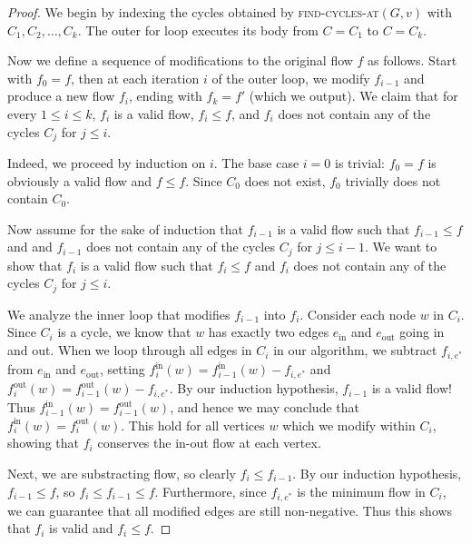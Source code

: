 \documentclass[10pt]{article}
\begin{document}
\begin{proof}
  We begin by indexing the cycles obtained by \textsc{find-cycles-at}\((G, v)\) with \(C_1, C_2, \ldots, C_k\). The outer for loop executes its body from \(C = C_1\) to \(C = C_k\). 

  Now we define a sequence of modifications to the original flow \(f\) as follows. Start with \(f_0 = f\), then at each iteration \(i\) of the outer loop, we modify \(f_{i - 1}\) and produce a new flow \(f_i\), ending with \(f_k = f'\) (which we output). We claim that for every \(1 \leq i \leq k\), \(f_i\) is a valid flow, \(f_i \leq f\), and \(f_i\) does not contain any of the cycles \(C_j\) for \(j \leq i\).

  Indeed, we proceed by induction on \(i\). The base case \(i = 0\) is trivial: \(f_0 = f\) is obviously a valid flow and \(f \leq f\). Since \(C_0\) does not exist, \(f_0\) trivially does not contain \(C_0\).

  Now assume for the sake of induction that \(f_{i - 1}\) is a valid flow such that \(f_{i - 1} \leq f\) and and \(f_{i - 1}\) does not contain any of the cycles \(C_j\) for \(j \leq i - 1\). We want to show that \(f_i\) is a valid flow such that \(f_i \leq f\) and \(f_i\) does not contain any of the cycles \(C_j\) for \(j \leq i\).

  We analyze the inner loop that modifies \(f_{i - 1}\) into \(f_i\). Consider each node \(w\) in \(C_i\). Since \(C_i\) is a cycle, we know that \(w\) has exactly two edges \(e_{\text{in}}\) and \(e_{\text{out}}\) going in and out. When we loop through all edges in \(C_i\) in our algorithm, we subtract \(f_{i, e^*}\) from \(e_{\text{in}}\) and \(e_{\text{out}}\), setting \(f_{i}^{\text{in}}(w) = f_{i - 1}^{\text{in}}(w) - f_{i, e^*}\) and \(f_{i}^{\text{out}}(w) = f_{i - 1}^{\text{out}}(w) - f_{i, e^*}\). By our induction hypothesis, \(f_{i - 1}\) is a valid flow! Thus \(f_{i - 1}^{\text{in}}(w) = f_{i - 1}^{\text{out}}(w)\), and hence we may conclude that \(f_{i}^{\text{in}}(w) = f_{i}^{\text{out}}(w)\). This hold for all vertices \(w\) which we modify within \(C_i\), showing that \(f_i\) conserves the in-out flow at each vertex. 
  
  Next, we are substracting flow, so clearly \(f_{i} \leq f_{i - 1}\). By our induction hypothesis, \(f_{i - 1} \leq f\), so \(f_i \leq f_{i - 1} \leq f\). Furthermore, since \(f_{i, e^*}\) is the minimum flow in \(C_i\), we can guarantee that all modified edges are still non-negative. Thus this shows that \(f_i\) is valid and \(f_{i} \leq f\). 
  

\end{proof}
\end{document}
